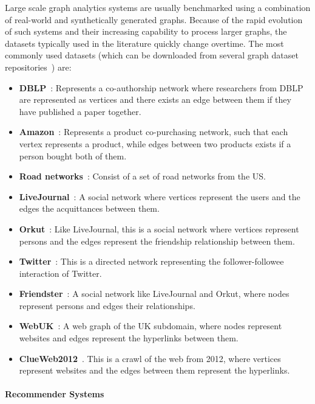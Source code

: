 Large scale graph analytics systems are usually benchmarked using a combination of
real-world and synthetically generated graphs. Because of the rapid evolution of such
systems and their increasing capability to process larger graphs, the datasets
typically used  in the literature quickly change overtime. The most commonly
used datasets (which can be downloaded from several graph dataset
repositories~\cite{snapnets,lawalgo}) are:
\begin{itemize}
  \item \textbf{DBLP}~\cite{yang2015defining}: Represents a co-authorship network where
    researchers from DBLP are represented as vertices and there exists an edge
    between them if they have published a paper together.
  \item \textbf{Amazon}~\cite{yang2015defining}: Represents a product co-purchasing
    network, such that each vertex represents a product, while edges between two products
    exists if a person bought both of them.
  \item \textbf{Road networks}~\cite{leskovec2009community}: Consist of a set of road
    networks from the US.
  \item \textbf{LiveJournal}~\cite{yang2015defining}: A social network where vertices
    represent the users and the edges the acquittances between them.
  \item \textbf{Orkut}~\cite{yang2015defining}: Like LiveJournal, this is a social network
    where vertices represent persons and the edges represent the friendship relationship between them.
  \item \textbf{Twitter}~\cite{kwak2010twitter}: This is a directed network representing
    the follower-followee interaction of Twitter.
  \item \textbf{Friendster}~\cite{yang2015defining}: A social network like LiveJournal and
    Orkut, where nodes represent persons and edges their relationships.
  \item \textbf{WebUK}~\cite{delis}: A web graph of the UK subdomain, where nodes represent
    websites and edges represent the hyperlinks between them.
  \item \textbf{ClueWeb2012}~\cite{clueweb}. This is a crawl of the web from 2012, where
    vertices represent websites and the edges between them represent the hyperlinks.
\end{itemize}

\paragraph{Recommender Systems}

